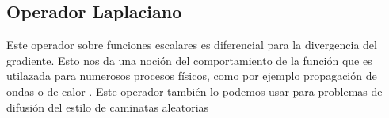 \subsection{Operador Laplaciano}
\label{Intro_laplaciano}

Este operador sobre funciones escalares es diferencial para la divergencia del gradiente. Esto nos da una noción del comportamiento de la función que es utilazada para numerosos procesos físicos, como por ejemplo propagación de ondas o de calor \cite{laplaciano_web}. Este operador también lo podemos usar para problemas de difusión del estilo de caminatas aleatorias \cite{random_walk}